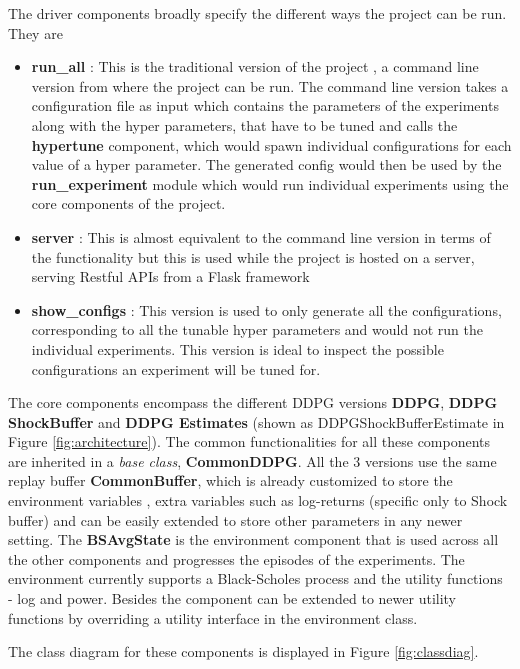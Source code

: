 The driver components broadly specify the different ways the project can be run. They are
\begin{itemize}
    \item \textbf{run\_all} : This is the traditional version of the project , a command line version from where the project can be run. The command line version takes a configuration file as input which contains the parameters of the experiments along with the hyper parameters, that have to be tuned and calls the \textbf{hypertune} component, which would spawn individual configurations for each value of a hyper parameter. The generated config would then be used by the \textbf{run\_experiment} module which would run individual experiments using the core components of the project.
    \item \textbf{server} : This is almost equivalent to the command line version in terms of the functionality but this is used while the project is hosted on a server, serving Restful APIs  \cite{fielding2000architectural} from a Flask framework \cite{UVicorn} 
    \item \textbf{show\_configs} : This version is used to only generate all the configurations, corresponding to all the tunable hyper parameters and would not run the individual experiments.  This version is ideal to inspect the possible configurations an experiment will be tuned for.
\end{itemize}
The core components encompass the different DDPG versions \textbf{DDPG}, \textbf{DDPG ShockBuffer}  and \textbf{DDPG Estimates} (shown as DDPGShockBufferEstimate in Figure \ref{fig:architecture}). The common functionalities for all these components are inherited in a \textit{base class}, \textbf{CommonDDPG}. All the 3 versions use the same replay buffer \textbf{CommonBuffer}, which is already customized to store the environment variables , extra variables such as log-returns (specific only to Shock buffer) and can be easily extended to store other parameters in any newer setting. The \textbf{BSAvgState} is the environment component that is used across all the other components and progresses the episodes of the experiments. The environment currently supports a Black-Scholes process and the utility functions - log and power. Besides the component can be extended to newer utility functions by overriding a utility interface in the environment class.   

The class diagram for these components is displayed in Figure \ref{fig:classdiag}.


